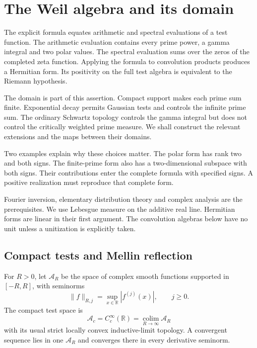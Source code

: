 \chapter{The Weil algebra and its domain}
\label{v4-arith:weil:chapter}

The explicit formula equates arithmetic and spectral evaluations of a test
function. The arithmetic evaluation contains every prime power, a gamma
integral and two polar values. The spectral evaluation sums over the zeros
of the completed zeta function. Applying the formula to convolution products
produces a Hermitian form. Its positivity on the full test algebra is
equivalent to the Riemann hypothesis.

The domain is part of this assertion. Compact support makes each prime sum
finite. Exponential decay permits Gaussian tests and controls the infinite
prime sum. The ordinary Schwartz topology controls the gamma integral but
does not control the critically weighted prime measure. We shall construct
the relevant extensions and the maps between their domains.

Two examples explain why these choices matter. The polar form has rank two
and both signs. The finite-prime form also has a two-dimensional subspace
with both signs. Their contributions enter the complete formula with
specified signs. A positive realization must reproduce that complete form.

Fourier inversion, elementary distribution theory and complex analysis are
the prerequisites. We use Lebesgue measure on the additive real line.
Hermitian forms are linear in their first argument. The convolution
algebras below have no unit unless a unitization is explicitly taken.

\section{Compact tests and Mellin reflection}
\label{v4-arith:weil:compact}

For \(R>0\), let \(\mathscr A_R\) be the space of complex smooth functions
supported in \([-R,R]\), with seminorms
\[
 \|f\|_{R,j}=\sup_{x\in\mathbb R}|f^{(j)}(x)|,\qquad j\ge0.
\]
The compact test space is
\[
 \mathscr A_c=C_c^\infty(\mathbb R)
       =\underset{R\to\infty}{\operatorname{colim}}\mathscr A_R
\]
with its usual strict locally convex inductive-limit topology. A convergent
sequence lies in one \(\mathscr A_R\) and converges there in every derivative
seminorm.

